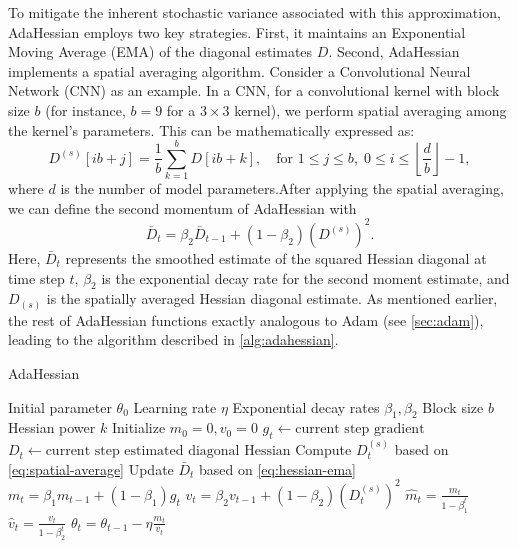To mitigate the inherent stochastic variance associated with this approximation, AdaHessian employs two key strategies.
First, it maintains an Exponential Moving Average (EMA) of the diagonal estimates $D$.
Second, AdaHessian implements a spatial averaging algorithm. Consider a Convolutional Neural Network (CNN) as an example. In a CNN, for a convolutional kernel with block size $b$ (for instance, $b = 9$ for a $3 \times 3$ kernel), we perform spatial averaging among the kernel's parameters.
This can be mathematically expressed as:
\begin{equation}
    \label{eq:spatial-average}
    D^{(s)}[ib+j] = \frac{1}{b} \sum_{k=1}^b D[ib + k], \quad \text{for } 1 \leq j \leq b, \; 0 \leq i \leq \left\lfloor\frac{d}{b}\right\rfloor - 1,
\end{equation}
where $d$ is the number of model parameters.After applying the spatial averaging, we can define the second momentum of AdaHessian with
\begin{equation}
    \label{eq:hessian-ema}
    \bar{D}_t = \beta_2 \bar{D}_{t-1} + (1 - \beta_2) (D^{(s)})^2.
\end{equation}
Here, $\bar{D}_t$ represents the smoothed estimate of the squared Hessian diagonal at time step $t$, $\beta_2$ is the exponential decay rate for the second moment estimate, and $D_{(s)}$ is the spatially averaged Hessian diagonal estimate.
As mentioned earlier, the rest of AdaHessian functions exactly analogous to Adam (see \ref{sec:adam}), leading to the
algorithm described in \ref{alg:adahessian}. \cite{yao2021adahessian}
\begin{algorithm}
    \caption{AdaHessian}
    \label{alg:adahessian}

    \begin{algorithmic}[1]
    \Require Initial parameter $\theta_0$
    \Require Learning rate $\eta$
    \Require Exponential decay rates $\beta_1, \beta_2$
    \Require Block size $b$
    \Require Hessian power $k$
    \State Initialize $m_0 = 0, v_0 = 0$
        \State $g_t \gets \text{current step gradient}$
        \State $D_t \gets \text{current step estimated diagonal Hessian}$
        \State Compute $D_t^{(s)}$ based on \ref{eq:spatial-average}
        \State Update $\bar{D}_t$ based on \ref{eq:hessian-ema}
        \State $m_t = \beta_1 m_{t-1} + (1 - \beta_1) g_t$
        \State $v_t = \beta_2 v_{t-1} + (1 - \beta_2) (D_t^{(s)})^2$
        \State $\hat{m}_t = \frac{m_t}{1-\beta_1^t}$
        \State $\hat{v}_t = \frac{v_t}{1-\beta_2^t}$
        \State $\theta_t = \theta_{t-1} - \eta \frac{m_t}{v_t}$
    \EndFor
    \end{algorithmic}
    \end{algorithm}
    
